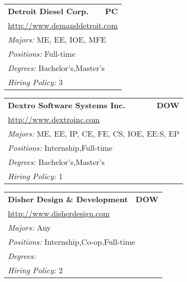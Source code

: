 \documentclass[twoside]{article}
\begin{document}
\begin{center}
\begin{multicols}{3}
\begin{FlushLeft}
\begin{minipage}{\columnwidth}
\end{minipage}
 
\begin{minipage}{\columnwidth}\begin{tabularx}{.95\columnwidth}{Xr}
                 {\Large\bf Detroit Diesel Corp.} & {\Large\bf PC}\\
    \multicolumn{2}{p{.95\columnwidth}}{\url{http://www.demanddetroit.com}}\\
    \multicolumn{2}{p{.95\columnwidth}}{\emph{Majors:} ME, EE, IOE, MFE}\\
    \multicolumn{2}{p{.95\columnwidth}}{\emph{Positions:} Full-time}\\
    \multicolumn{2}{p{.95\columnwidth}}{\emph{Degrees:} Bachelor's,Master's}\\
    \multicolumn{2}{p{.95\columnwidth}}{\emph{Hiring Policy:} 3}\\
    \end{tabularx}
    
\end{minipage}
 
\begin{minipage}{\columnwidth}\begin{tabularx}{.95\columnwidth}{Xr}
                 {\Large\bf Dextro Software Systems Inc.} & {\Large\bf DOW}\\
    \multicolumn{2}{p{.95\columnwidth}}{\url{http://www.dextroinc.com}}\\
    \multicolumn{2}{p{.95\columnwidth}}{\emph{Majors:} ME, EE, IP, CE, FE, CS, IOE, EE:S, EP}\\
    \multicolumn{2}{p{.95\columnwidth}}{\emph{Positions:} Internship,Full-time}\\
    \multicolumn{2}{p{.95\columnwidth}}{\emph{Degrees:} Bachelor's,Master's}\\
    \multicolumn{2}{p{.95\columnwidth}}{\emph{Hiring Policy:} 1}\\
    \end{tabularx}
    
\end{minipage}
 
\begin{minipage}{\columnwidth}\begin{tabularx}{.95\columnwidth}{Xr}
                 {\Large\bf Disher Design \& Development} & {\Large\bf DOW}\\
    \multicolumn{2}{p{.95\columnwidth}}{\url{http://www.disherdesign.com}}\\
    \multicolumn{2}{p{.95\columnwidth}}{\emph{Majors:} Any}\\
    \multicolumn{2}{p{.95\columnwidth}}{\emph{Positions:} Internship,Co-op,Full-time}\\
    \multicolumn{2}{p{.95\columnwidth}}{\emph{Degrees:} }\\
    \multicolumn{2}{p{.95\columnwidth}}{\emph{Hiring Policy:} 2}\\
    \end{tabularx}
    

\end{minipage}
\end{FlushLeft}
\end{multicols}
\end{center}
\end{document}
